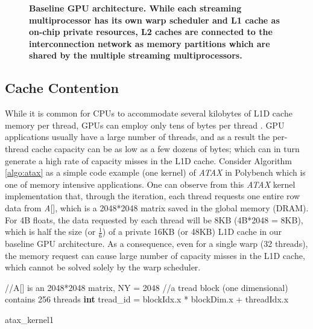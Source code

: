 \documentclass{sigplanconf}
\begin{document}
\begin{figure}
\begin{center}
\end{center}
\vspace{-10pt}
\caption{\textbf{Baseline GPU architecture. While each streaming multiprocessor has its own warp scheduler and L1 cache as on-chip private resources, L2 caches are connected to the interconnection network as memory partitions which are shared by the multiple streaming multiprocessors. \label{fig:gpu}}}
\end{figure}



\subsection{Cache Contention}
\label{sec:contention}

While it is common for CPUs to accommodate several kilobytes of L1D cache memory per thread, GPUs can employ only tens of bytes per thread \cite{jia2014mrpb}. GPU applications usually have a large number of threads, and as a result the per-thread cache capacity can be as low as a few dozens of bytes; which can in turn generate a high rate of capacity misses in the L1D cache. Consider Algorithm \ref{algo:atax} as a simple code example (one kernel) of \textit{ATAX} in Polybench \cite{grauer2012auto} which is one of memory intensive applications. One can observe from this \textit{ATAX} kernel implementation that, through the iteration, each thread requests one entire row data from \textit{A}[], which is a 2048*2048 matrix saved in the global memory (DRAM). For 4B floats, the data requested by each thread will be 8KB (4B*2048 = 8KB), which is half the size (or $\frac{1}{6}$) of a private 16KB (or 48KB) L1D cache in our baseline GPU architecture. As a consequence, even for a single warp (32 threads), the memory request can cause large number of capacity misses in the L1D cache, which cannot be solved solely by the warp scheduler.

\begin{algorithm}
\DontPrintSemicolon
//A[] is an 2048*2048 matrix, NY = 2048\;
//a tread block (one dimensional) contains 256 threads\;
\textbf{int} tread\_id = blockIdx.x * blockDim.x + threadIdx.x\;
\caption{atax\_kernel1}
\label{algo:atax}
\end{algorithm}
\end{document}
